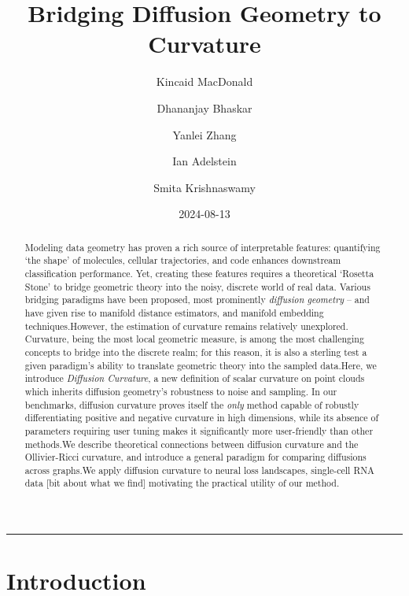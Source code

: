 \documentclass[
  letterpaper,
  DIV=11,
  numbers=noendperiod]{scrartcl}
\title{Bridging Diffusion Geometry to Curvature}
\author{Kincaid MacDonald \and Dhananjay Bhaskar \and Yanlei
Zhang \and Ian Adelstein \and Smita Krishnaswamy}
\date{2024-08-13}
\theoremstyle{plain}
\theoremstyle{definition}
\theoremstyle{definition}
\theoremstyle{plain}
\theoremstyle{plain}
\theoremstyle{remark}
\begin{document}
\maketitle
\begin{abstract}
Modeling data geometry has proven a rich source of interpretable
features: quantifying `the shape' of molecules, cellular trajectories,
and code enhances downstream classification performance. Yet, creating
these features requires a theoretical `Rosetta Stone' to bridge
geometric theory into the noisy, discrete world of real data. Various
bridging paradigms have been proposed, most prominently \emph{diffusion
geometry} -- and have given rise to manifold distance estimators, and
manifold embedding techniques.However, the estimation of curvature
remains relatively unexplored. Curvature, being the most local geometric
measure, is among the most challenging concepts to bridge into the
discrete realm; for this reason, it is also a sterling test a given
paradigm's ability to translate geometric theory into the sampled
data.Here, we introduce \emph{Diffusion Curvature}, a new definition of
scalar curvature on point clouds which inherits diffusion geometry's
robustness to noise and sampling. In our benchmarks, diffusion curvature
proves itself the \emph{only} method capable of robustly differentiating
positive and negative curvature in high dimensions, while its absence of
parameters requiring user tuning makes it significantly more
user-friendly than other methods.We describe theoretical connections
between diffusion curvature and the Ollivier-Ricci curvature, and
introduce a general paradigm for comparing diffusions across graphs.We
apply diffusion curvature to neural loss landscapes, single-cell RNA
data {[}bit about what we find{]} motivating the practical utility of
our method.
\end{abstract}
\begin{center}\rule{0.5\linewidth}{0.5pt}\end{center}

\newcommand\Kaly[1]{\textcolor{blue}{Kaly: [[[#1]]]}}

\section{Introduction}\label{introduction}
\end{document}

